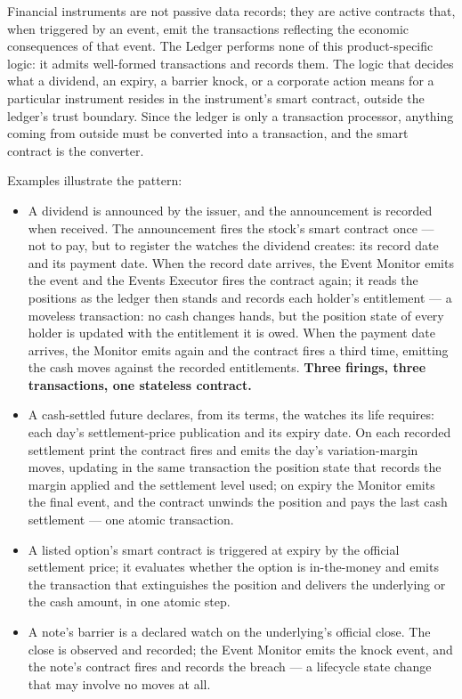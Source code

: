 \documentclass[11pt,a4paper]{article}
\begin{document}
Financial instruments are not passive data records; they are active
contracts that, when triggered by an event, emit the transactions
reflecting the economic consequences of that event. The Ledger performs
none of this product-specific logic: it admits well-formed transactions
and records them. The logic that decides what a dividend, an expiry, a
barrier knock, or a corporate action means for a particular instrument
resides in the instrument's smart contract, outside the ledger's trust
boundary. Since the ledger is only a transaction processor, anything
coming from outside must be converted into a transaction, and the smart
contract is the converter.

Examples illustrate the pattern:

\begin{itemize}
\item
  A dividend is announced by the issuer, and the announcement is
  recorded when received. The announcement fires the stock's smart
  contract once --- not to pay, but to register the watches the dividend
  creates: its record date and its payment date. When the record date
  arrives, the Event Monitor emits the event and the Events Executor
  fires the contract again; it reads the positions as the ledger then
  stands and records each holder's entitlement --- a moveless
  transaction: no cash changes hands, but the position state of every
  holder is updated with the entitlement it is owed. When the payment
  date arrives, the Monitor emits again and the contract fires a third
  time, emitting the cash moves against the recorded entitlements.
  \textbf{Three firings, three transactions, one stateless contract.}
\item
  A cash-settled future declares, from its terms, the watches its life
  requires: each day's settlement-price publication and its expiry date.
  On each recorded settlement print the contract fires and emits the
  day's variation-margin moves, updating in the same transaction the
  position state that records the margin applied and the settlement
  level used; on expiry the Monitor emits the final event, and the
  contract unwinds the position and pays the last cash settlement ---
  one atomic transaction.
\item
  A listed option's smart contract is triggered at expiry by the
  official settlement price; it evaluates whether the option is
  in-the-money and emits the transaction that extinguishes the position
  and delivers the underlying or the cash amount, in one atomic step.
\item
  A note's barrier is a declared watch on the underlying's official
  close. The close is observed and recorded; the Event Monitor emits the
  knock event, and the note's contract fires and records the breach ---
  a lifecycle state change that may involve no moves at all.
\end{itemize}
\end{document}
